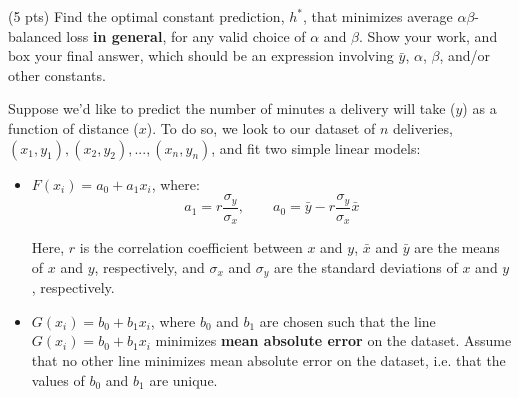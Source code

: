 \documentclass[twoside,12pt]{article}
\begin{document}
\begin{probset}
\begin{prob}[(9 pts)]
\begin{subprobset}
\begin{subprob}
\end{subprob}

\vspace{0.1in}

\begin{subprob}(5 pts) Find the optimal constant prediction, $h^*$, that minimizes average $\alpha \beta$-balanced loss \textbf{in general}, for any valid choice of $\alpha$ and $\beta$. Show your work, and $\boxed{\text{box}}$ your final answer, which should be an expression involving $\bar{y}$, $\alpha$, $\beta$, and/or other constants.

\begin{responsebox}{4in}
    
\end{responsebox}

\end{subprob}

\end{subprobset}

\end{prob}

\newpage

\begin{prob}[(6 pts)]

Suppose we'd like to predict the number of minutes a delivery will take ($y$) as a function of distance ($x$). To do so, we look to our dataset of $n$ deliveries, $(x_1, y_1), (x_2, y_2), ..., (x_n, y_n)$, and fit two simple linear models:

\begin{itemize}
    \item $F(x_i) = a_0 + a_1 x_i$, where: $$a_1 = r \frac{\sigma_y}{\sigma_x}, \qquad a_0 = \bar{y} - r \frac{\sigma_y}{\sigma_x} \bar{x}$$

    Here, $r$ is the correlation coefficient between $x$ and $y$, $\bar{x}$ and $\bar{y}$ are the means of $x$ and $y$, respectively, and $\sigma_x$ and $\sigma_y$ are the standard deviations of $x$ and $y$, respectively.
    
    \item $G(x_i) = b_0 + b_1 x_i$, where $b_0$ and $b_1$ are chosen such that the line $G(x_i) = b_0 + b_1 x_i$ minimizes \textbf{mean absolute error} on the dataset. Assume that no other line minimizes mean absolute error on the dataset, i.e. that the values of $b_0$ and $b_1$ are unique.
\end{itemize}



\end{prob}
\end{probset}
\end{document}
